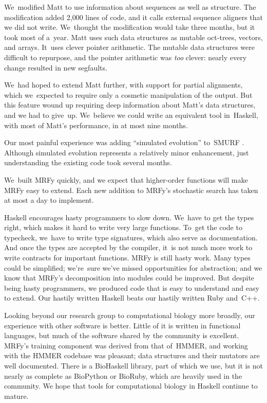 \documentclass[preprint,nonatbib,blockstyle,times]{sigplanconf}
\let\cite\citep
\begin{document}
We~modified Matt to use information about sequences as well as structure.
The modification added 2,000 lines of code, and it calls
external sequence aligners that we did not write.
We~thought the modification would take three months, 
but it took most of a~year.
Matt uses such
data structures as mutable oct-trees, vectors, and arrays.
It~uses clever pointer arithmetic.
The mutable data structures were difficult to 
repurpose, and the pointer arithmetic was \emph{too} clever: 
nearly every change resulted in new segfaults.

We~had hoped to extend Matt further, with support for partial alignments,
which we~expected to require only 
a cosmetic manipulation of the 
output.
But
this feature wound up
requiring deep information about Matt's data structures,
and we had to give~up.
We~believe we could write an equivalent tool in~Haskell,
with most of Matt's performance, in at most nine months.

Our most painful experience was adding ``simulated evolution''
to~SMURF \cite{Daniels:2012}. 
Although simulated evolution represents a relatively minor
enhancement,
just understanding the existing code took several months.

We~built MRFy quickly, and we expect that
higher-order functions will make MRFy easy to extend.
Each new addition to MRFy's stochastic search has taken at most a day
to implement.

Haskell encourages hasty programmers to slow down.
We~have to get the types right,
which makes it hard to write very large functions.
To~get the code to typecheck, we~have to write type signatures, which
also serve as documentation.
And once the types are accepted by the compiler,
it~is not much more work to write contracts for important functions.
MRFy is still hasty work.
Many types could be simplified;
we're~sure we've missed opportunities for abstraction;
and we know that MRFy's decomposition into modules could be improved.
But despite being hasty programmers, we produced code 
that is easy to understand and easy to extend.
Our hastily written Haskell beats
our hastily written Ruby and~C++.


Looking beyond our research group to computational biology more
broadly, our experience with other software is better.
Little of it is written in functional languages, 
but much of the software shared by the community is excellent.
MRFy's training component was derived from that of~HMMER,
and
working with the HMMER 
codebase was pleasant;
data structures and their
mutators are well documented. 
There is a 
BioHaskell library, part of which we use,
but it is not nearly as 
complete as BioPython or BioRuby, which are heavily used in the community.
We hope that tools for computational biology in
Haskell continue to mature. 
\end{document}
